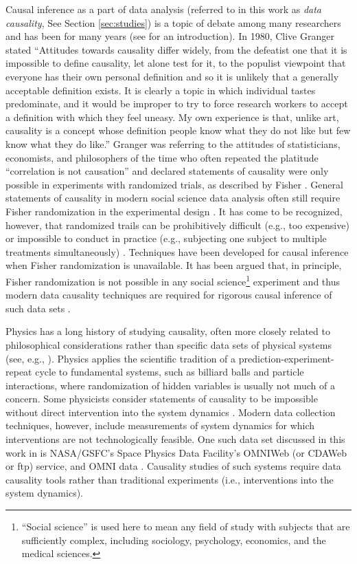 \documentclass{article}[10pt]
\begin{document}
Causal inference as a part of data analysis (referred to in this work as {\em data causality}, See Section \ref{sec:studies}) is a topic of debate among many researchers and has been for many years (see \cite{Illari2014} for an introduction).  In 1980, Clive Granger stated ``Attitudes towards causality differ widely, from the defeatist one that it is impossible to define causality, let alone test for it, to the populist viewpoint that everyone has their own personal definition and so it is unlikely that a generally acceptable definition exists. It is clearly a topic in which individual tastes predominate, and it would be improper to try to force research workers to accept a definition with which they feel uneasy. My own experience is that, unlike art, causality is a concept whose definition people know what they do not like but few know what they do like.'' \cite{Granger1980}  Granger was referring to the attitudes of statisticians, economists, and philosophers of the time who often repeated the platitude ``correlation is not causation'' \cite{Granger2003} and declared statements of causality were only possible in experiments with randomized trials, as described by Fisher \cite{Fisher1934,Fisher1960}.  General statements of causality in modern social science data analysis often still require Fisher randomization in the experimental design \cite{Imbens2015,Morgan2014}.  It has come to be recognized, however, that randomized trails can be prohibitively difficult (e.g., too expensive) or impossible to conduct in practice (e.g., subjecting one subject to multiple treatments simultaneously) \cite{Morgan2014,Imbens2015}.  Techniques have been developed for causal inference when Fisher randomization is unavailable.  It has been argued that, in principle, Fisher randomization is not possible in any social science\footnote{``Social science'' is used here to mean any field of study with subjects that are sufficiently complex, including sociology, psychology, economics, and the medical sciences.} experiment and thus modern data causality techniques are required for rigorous causal inference of such data sets \cite{Illari2011b}.

Physics has a long history of studying causality, often more closely related to philosophical considerations rather than specific data sets of physical systems (see, e.g., \cite{Bohm1971}).  Physics applies the scientific tradition of a prediction-experiment-repeat cycle \cite{Godfrey2009} to fundamental systems, such as billiard balls and particle interactions, where randomization of hidden variables is usually not much of a concern.  Some physicists consider statements of causality to be impossible without direct intervention into the system dynamics \cite{Bunge1979}.  Modern data collection techniques, however, include measurements of system dynamics for which interventions are not technologically feasible.  One such data set discussed in this work in is NASA/GSFC's Space Physics Data Facility's OMNIWeb (or CDAWeb or ftp) service, and OMNI data \cite{King2005}.  Causality studies of such systems require data causality tools rather than traditional experiments (i.e., interventions into the system dynamics).  
\end{document}
